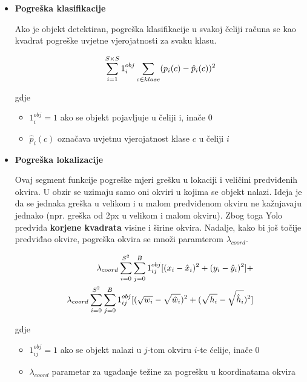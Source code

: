 \begin{itemize}
	\item{\textbf{Pogreška klasifikacije}}
	
	Ako je objekt detektiran, pogreška klasifikacije u svakoj čeliji računa se kao kvadrat pogreške uvjetne vjerojatnosti za svaku klasu.
	
	\begin{equation}
		\centering
		\sum_{i=1}^{S\times S} 1_i^{obj} \sum_{c \in klase} (p_i(c) - \hat{p}_i(c))^2
		\label{eq:classification-loss}
	\end{equation}
	
	gdje 
	\begin{itemize}
		\item $1_i^{obj} = 1$ ako se objekt pojavljuje u čeliji i, inače $0$
		\item $\hat{p}_i(c)$ označava uvjetnu vjerojatnost klase $c$ u čeliji $i$
	\end{itemize}
	
	\item{\textbf{Pogreška lokalizacije}}
	
	Ovaj segment funkcije pogreške mjeri grešku u lokaciji i veličini predviđenih okvira. U obzir se uzimaju samo oni okviri u kojima se objekt nalazi. Ideja je da se jednaka greška u velikom i u malom predviđenom okviru ne kažnjavaju jednako (npr. greška od 2px u velikom i malom okviru). Zbog toga Yolo predviđa \textbf{korjene kvadrata} visine i širine okvira. Nadalje, kako bi još točije predviđao okvire, pogreška okvira se množi paramterom $\lambda_{coord}$.
	
	\begin{align}
		\centering
		\begin{split}
			\lambda_{coord}\sum_{i=0}^{S^2}\sum_{j=0}^{B} 1_{ij}^{obj} [(x_i - \hat{x}_i)^2 + (y_i - \hat{y}_i)^2] + \\
			\lambda_{coord}\sum_{i=0}^{S^2}\sum_{j=0}^{B} 1_{ij}^{obj} [(\sqrt{w_i} - \sqrt{\hat{w}_i})^2 + (\sqrt{h_i} - \sqrt{\hat{h}_i})^2]
		\end{split}
		\label{eq:localization-loss}
	\end{align}
	
	gdje 
	\begin{itemize}
		\item $1_{ij}^{obj} = 1$ ako se objekt nalazi u $j$-tom okviru $i$-te ćelije, inače $0$
		\item $\lambda_{coord}$ parametar za ugađanje težine za pogrešku u koordinatama okvira
	\end{itemize}
	

\end{itemize}
